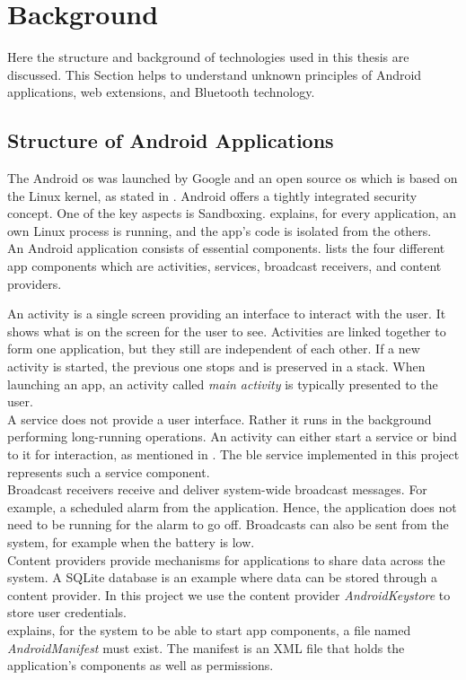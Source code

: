 \section{Background} \label{background}
Here the structure and background of technologies used in this thesis are discussed. This Section helps to understand unknown principles of Android applications, web extensions, and Bluetooth technology.

\subsection{Structure of Android Applications}
The Android \gls{os} was launched by Google and an open source \gls{os} which is based on the Linux kernel, as stated in \cite{liu2011research}. Android offers a tightly integrated security concept. One of the key aspects is Sandboxing. \cite{AndroidFundamentals} explains, for every application, an own Linux process is running, and the app's code is isolated from the others. \\
An Android application consists of essential components.  \cite{liu2011research} lists the four different app components which are activities, services, broadcast receivers, and content providers.

An activity is a single screen providing an interface to interact with the user. It shows what is on the screen for the user to see. Activities are linked together to form one application, but they still are independent of each other. If a new activity is started, the previous one stops and is preserved in a stack. When launching an app, an activity called \textit{main activity} is typically presented to the user. \\
A service does not provide a user interface. Rather it runs in the background performing long-running operations. An activity can either start a service or bind to it for interaction, as mentioned in \cite{AndroidFundamentals}. The \gls{ble} service implemented in this project represents such a service component. \\
Broadcast receivers receive and deliver system-wide broadcast messages. For example, a scheduled alarm from the application. Hence, the application does not need to be running for the alarm to go off. Broadcasts can also be sent from the system, for example when the battery is low. \\
Content providers provide mechanisms for applications to share data across the system. A SQLite database is an example where data can be stored through a content provider. In this project we use the content provider \textit{AndroidKeystore} to store user credentials. \\
\cite{AndroidFundamentals} explains, for the system to be able to start app components, a file named \textit{AndroidManifest} must exist. The manifest is an XML file that holds the application's components as well as permissions.


